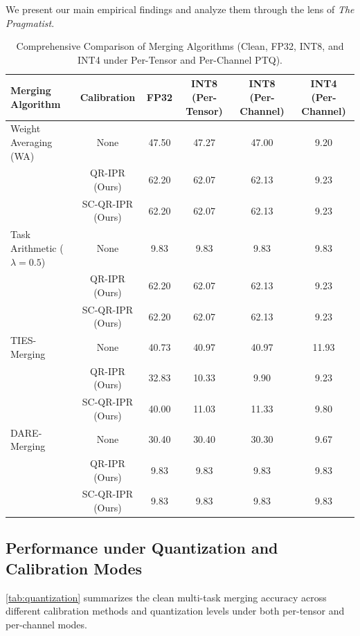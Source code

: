 \documentclass{article}
\theoremstyle{plain}
\theoremstyle{definition}
\theoremstyle{remark}
\begin{document}
We present our main empirical findings and analyze them through the lens of \emph{The Pragmatist}.

\vspace{-1.5mm}
\begin{table}[t]
\caption{Comprehensive Comparison of Merging Algorithms (Clean, FP32, INT8, and INT4 under Per-Tensor and Per-Channel PTQ).}
\label{tab:merging_comparison}
\vspace{-2.5mm}
\begin{center}
\begin{scriptsize}
\renewcommand{\arraystretch}{0.76}
\setlength{\tabcolsep}{4pt}
\begin{tabular}{lccccc}
\toprule
\textbf{Merging Algorithm} & \textbf{Calibration} & \textbf{FP32} & \textbf{INT8 (Per-Tensor)} & \textbf{INT8 (Per-Channel)} & \textbf{INT4 (Per-Channel)} \\
\midrule
Weight Averaging (WA) & None & 47.50 & 47.27 & 47.00 & 9.20 \\
 & QR-IPR (Ours) & 62.20 & 62.07 & 62.13 & 9.23 \\
 & SC-QR-IPR (Ours) & 62.20 & 62.07 & 62.13 & 9.23 \\
\midrule
Task Arithmetic ($\lambda=0.5$) & None & 9.83 & 9.83 & 9.83 & 9.83 \\
 & QR-IPR (Ours) & 62.20 & 62.07 & 62.13 & 9.23 \\
 & SC-QR-IPR (Ours) & 62.20 & 62.07 & 62.13 & 9.23 \\
\midrule
TIES-Merging & None & 40.73 & 40.97 & 40.97 & 11.93 \\
 & QR-IPR (Ours) & 32.83 & 10.33 & 9.90 & 9.23 \\
 & SC-QR-IPR (Ours) & 40.00 & 11.03 & 11.33 & 9.80 \\
\midrule
DARE-Merging & None & 30.40 & 30.40 & 30.30 & 9.67 \\
 & QR-IPR (Ours) & 9.83 & 9.83 & 9.83 & 9.83 \\
 & SC-QR-IPR (Ours) & 9.83 & 9.83 & 9.83 & 9.83 \\
\bottomrule
\end{tabular}
\end{scriptsize}
\end{center}
\end{table}
\vspace{-1.5mm}

\subsection{Performance under Quantization and Calibration Modes}
\cref{tab:quantization} summarizes the clean multi-task merging accuracy across different calibration methods and quantization levels under both per-tensor and per-channel modes.
\end{document}
